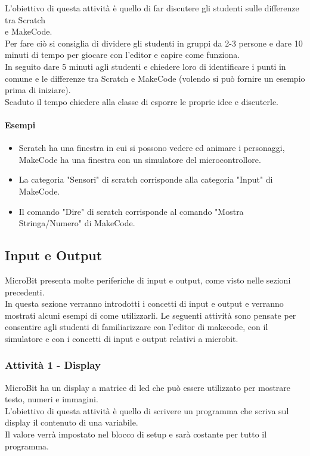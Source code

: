 \documentclass[../../docenti.tex]{subfiles}
\begin{document}
L'obiettivo di questa attività è quello di far discutere gli studenti sulle differenze tra Scratch\\ e MakeCode.\\
Per fare ciò si consiglia di dividere gli studenti in gruppi da 2-3 persone e dare 10 minuti di tempo per giocare con l'editor e capire come funziona.\\
In seguito dare 5 minuti agli studenti e chiedere loro di identificare i punti in comune e le differenze tra Scratch e MakeCode (volendo si può fornire un esempio prima di iniziare).\\
Scaduto il tempo chiedere alla classe di esporre le proprie idee e discuterle.

\newpage
\paragraph{Esempi}
\begin{itemize}
	\item Scratch ha una finestra in cui si possono vedere ed animare i personaggi, MakeCode ha una finestra con un simulatore del microcontrollore.
	\item La categoria "Sensori" di scratch corrisponde alla categoria "Input" di MakeCode.
	\item Il comando "Dire" di scratch corrisponde al comando "Mostra Stringa/Numero" di MakeCode.
\end{itemize}

\subsection{Input e Output}
MicroBit presenta molte periferiche di input e output, come visto nelle sezioni precedenti.\\
In questa sezione verranno introdotti i concetti di input e output e verranno mostrati alcuni esempi di come utilizzarli.
Le seguenti attività sono pensate per consentire agli studenti di familiarizzare con l'editor di makecode, con il simulatore e con i concetti di input e output relativi a microbit.

\subsubsection{Attività 1 - Display}
MicroBit ha un display a matrice di led che può essere utilizzato per mostrare testo, numeri e immagini.\\
L'obiettivo di questa attività è quello di scrivere un programma che scriva sul display il contenuto di una variabile.\\
Il valore verrà impostato nel blocco di setup e sarà costante per tutto il programma.
\end{document}
